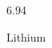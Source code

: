 \documentclass[12pt]{article}
\begin{document}
\hfill{}
\vfill
\begin{center}
  {\fontsize{50}{60}
  }

  \vspace{1em}

  6.94

Lithium
\end{center}
\vfill
\end{document}
